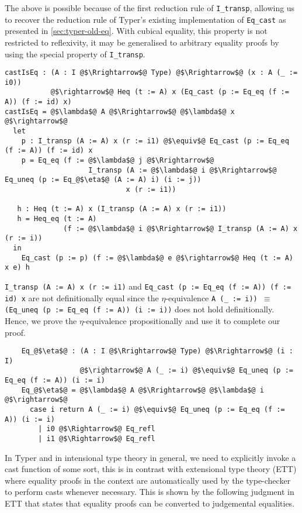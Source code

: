 \documentclass[12pt,twoside,maitrise]{dms}
\theoremstyle{definition}
\numberwithin{equation}{section}
\numberwithin{table}{chapter}
\numberwithin{figure}{chapter}
\newcommand\id[1] {\texttt{#1}}
\newcommand\fn[1] {\texttt{#1}}
\begin{document}
The above is possible because of the first reduction rule of \id{I\_transp},
allowing us to recover the reduction rule of Typer's existing implementation of
\id{Eq\_cast} as presented in \autoref{sec:typer-old-eq}. With cubical equality,
this property is not restricted to reflexivity, it may be generalised to
arbitrary equality proofs by using the special property of \id{I\_transp}.

\begin{verbatim}
castIsEq : (A : I @$\Rrightarrow$@ Type) @$\Rrightarrow$@ (x : A (_ := i0))
           @$\rightarrow$@ Heq (t := A) x (Eq_cast (p := Eq_eq (f := A)) (f := id) x)
castIsEq = @$\lambda$@ A @$\Rrightarrow$@ @$\lambda$@ x @$\rightarrow$@
  let
    p : I_transp (A := A) x (r := i1) @$\equiv$@ Eq_cast (p := Eq_eq (f := A)) (f := id) x
    p = Eq_eq (f := @$\lambda$@ j @$\Rrightarrow$@
                    I_transp (A := @$\lambda$@ i @$\Rrightarrow$@ Eq_uneq (p := Eq_@$\eta$@ (A := A) i) (i := j))
                             x (r := i1))

   h : Heq (t := A) x (I_transp (A := A) x (r := i1))
   h = Heq_eq (t := A)
              (f := @$\lambda$@ i @$\Rrightarrow$@ I_transp (A := A) x (r := i))
  in
    Eq_cast (p := p) (f := @$\lambda$@ e @$\rightarrow$@ Heq (t := A) x e) h
\end{verbatim}


\fn{I_transp (A := A) x (r := i1)} and \fn{Eq_cast (p := Eq_eq (f := A)) (f :=
  id) x} are not definitionally equal since the $\eta$-equivalence \fn{A (_ :=
  i)) $\equiv$ (Eq_uneq (p := Eq_eq (f := A)) (i := i))} does not hold
definitionally. Hence, we prove the $\eta$-equivalence propositionally and use
it to complete our proof.

\begin{verbatim}
    Eq_@$\eta$@ : (A : I @$\Rrightarrow$@ Type) @$\Rrightarrow$@ (i : I)
                  @$\rightarrow$@ A (_ := i) @$\equiv$@ Eq_uneq (p := Eq_eq (f := A)) (i := i)
    Eq_@$\eta$@ = @$\lambda$@ A @$\Rrightarrow$@ @$\lambda$@ i @$\rightarrow$@
      case i return A (_ := i) @$\equiv$@ Eq_uneq (p := Eq_eq (f := A)) (i := i)
        | i0 @$\Rightarrow$@ Eq_refl
        | i1 @$\Rightarrow$@ Eq_refl
\end{verbatim}


In Typer and in intensional type theory in general, we need to explicitly invoke
a cast function of some sort, this is in contrast with extensional type theory
(ETT)\cite{martin1982constructive} where equality proofs in the context are
automatically used by the type-checker to perform casts whenever necessary. This
is shown by the following judgment in ETT that states that equality proofs can
be converted to judgemental equalities.
\end{document}
